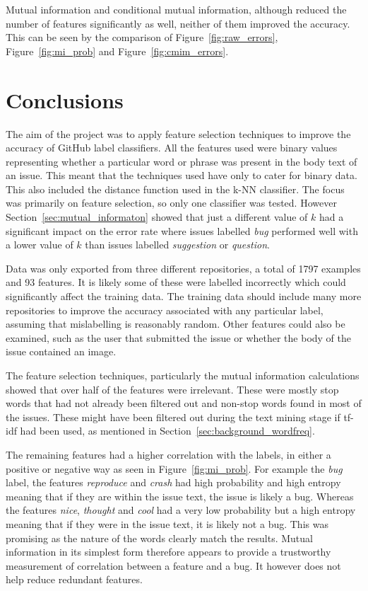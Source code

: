 Mutual information and conditional mutual information, although reduced the number of features significantly as well, neither
of them improved the accuracy. This can be seen by the comparison of Figure~\ref{fig:raw_errors}, Figure~\ref{fig:mi_prob} and
Figure~\ref{fig:cmim_errors}.

\section{Conclusions}
The aim of the project was to apply feature selection techniques to improve the accuracy of GitHub label classifiers. All the
features used were binary values representing whether a particular word or phrase was present in the body text of an issue. This
meant that the techniques used have only to cater for binary data. This also included the distance function used in the k-NN
classifier. The focus was primarily on feature selection, so only one classifier was tested. However
Section~\ref{sec:mutual_informaton} showed that just a different value of $k$ had a significant impact on the error rate where
issues labelled \textit{bug} performed well with a lower value of $k$ than issues labelled \textit{suggestion} or
\textit{question}.

Data was only exported from three different repositories, a total of 1797 examples and 93 features. It is likely some of these
were labelled incorrectly which could significantly affect the training data. The training data should include many more
repositories to improve the accuracy associated with any particular label, assuming that mislabelling is reasonably random.
Other features could also be examined, such as the user that submitted the issue or whether the body of the issue contained an
image.

The feature selection techniques, particularly the mutual information calculations showed that over half of the features were
irrelevant. These were mostly stop words that had not already been filtered out and non-stop words found in most of the issues.
These might have been filtered out during the text mining stage if tf-idf had been used, as mentioned in
Section~\ref{sec:background_wordfreq}.

The remaining features had a higher correlation with the labels, in either a positive or negative way as seen in
Figure~\ref{fig:mi_prob}. For example the \textit{bug} label, the features \textit{reproduce} and \textit{crash} had high
probability and high entropy meaning that if they are within the issue text, the issue is likely a bug. Whereas the features
\textit{nice}, \textit{thought} and \textit{cool} had a very low probability but a high entropy meaning that if they were in the
issue text, it is likely not a bug. This was promising as the nature of the words clearly match the results. Mutual information
in its simplest form therefore appears to provide a trustworthy measurement of correlation between a feature and a bug. It
however does not help reduce redundant features.

